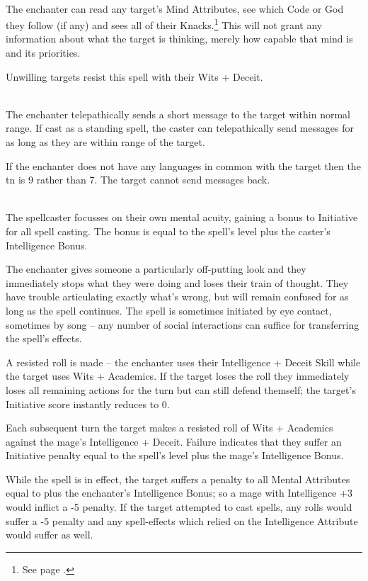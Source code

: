 \begin{multicols}{2}
\\
The enchanter can read any target's Mind Attributes, see which Code or God they follow (if any) and sees all of their Knacks.\footnote{See page \pageref{gods_codes}.}
This will not grant any information about what the target is thinking, merely how capable that mind is and its priorities.

Unwilling targets resist this spell with their Wits + Deceit.

\\
The enchanter telepathically sends a short message to the target within normal range. If cast as a standing spell, the caster can telepathically send messages for as long as they are within range of the target.

If the enchanter does not have any languages in common with the target then the \gls{tn} is 9 rather than 7. The target cannot send messages back.

\\
The spellcaster focusses on their own mental acuity, gaining a bonus to Initiative for all spell casting.
The bonus is equal to the spell's level plus the caster's Intelligence Bonus.

\spelllevel


The enchanter gives someone a particularly off-putting look and they immediately stops what they were doing and loses their train of thought.
They have trouble articulating exactly what's wrong, but will remain confused for as long as the spell continues.
The spell is sometimes initiated by eye contact, sometimes by song -- any number of social interactions can suffice for transferring the spell's effects.

A resisted roll is made -- the enchanter uses their Intelligence + Deceit Skill while the target uses Wits + Academics.
If the target loses the roll they immediately loses all remaining actions for the turn but can still defend themself; the target's Initiative score instantly reduces to 0.

Each subsequent turn the target makes a resisted roll of Wits + Academics against the mage's Intelligence + Deceit. Failure indicates that they suffer an Initiative penalty equal to the spell's level plus the mage's Intelligence Bonus.

While the spell is in effect, the target suffers a penalty to all Mental Attributes equal to  plus the enchanter's Intelligence Bonus; so a mage with Intelligence +3 would inflict a -5 penalty. If the target attempted to cast spells, any rolls would suffer a -5 penalty and any spell-effects which relied on the Intelligence Attribute would suffer as well.


\end{multicols}
